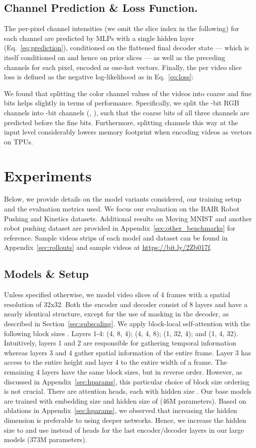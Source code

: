 \documentclass{article} \usepackage{iclr2020_conference,times}
\begin{document}
\subsection{Channel Prediction \& Loss Function.}

The per-pixel channel intensities  (we omit the slice index  in the following) for each channel  are predicted by MLPs with a single hidden layer (Eq.~\ref{eq:prediction}), conditioned on the flattened final decoder state  --- which is itself conditioned on  and hence on prior slices  --- as well as the preceding channels  for each pixel, encoded as one-hot vectors. Finally, the per video slice loss is defined as the negative log-likelihood as in Eq.~\ref{eq:loss}:


We found that splitting the color channel values of the videos into coarse and fine bits helps slightly in terms of performance. Specifically, we split the -bit RGB channels into -bit channels (,  ), such that the coarse bits of all three channels are predicted before the fine bits. Furthermore, splitting channels this way at the input level considerably lowers memory footprint when encoding videos as  vectors on TPUs.


\section{Experiments}
Below, we provide details on the model variants considered, our training setup and the evaluation metrics used. We focus our evaluation on the BAIR Robot Pushing and Kinetics datasets. Additional results on Moving MNIST and another robot pushing dataset are provided in Appendix~\ref{sec:other_benchmarks} for reference.
Sample videos strips of each model and dataset can be found in Appendix~\ref{sec:rollouts} and sample videos at \url{https://bit.ly/2Zb017f}.

\subsection{Models \& Setup}
Unless specified otherwise, we model video slices of 4 frames with a spatial resolution of 32x32.
Both the encoder and decoder consist of 8 layers and have a nearly identical structure, except for the use of masking in the decoder, as described in Section~\ref{sec:subscaling}. We apply block-local self-attention with the following block sizes . Layers 1-4: (4, 8, 4); (4, 4, 8); (1, 32, 4); and (1, 4, 32). Intuitively, layers 1 and 2 are responsible for gathering temporal information whereas layers 3 and 4 gather spatial information of the entire frame. Layer 3 has access to the entire height and layer 4 to the entire width of a frame. The remaining 4 layers have the same block sizes, but in reverse order. However, as discussed in Appendix~\ref{sec:hparams}, this particular choice of block size ordering is not crucial.
There are  attention heads, each with hidden size . Our base models are trained with embedding size  and hidden size of  (46M parameters). Based on ablations in Appendix~\ref{sec:hparams}, we observed that increasing the hidden dimension is preferable to using deeper networks. Hence, we increase the hidden size to  and use  instead of  heads for the last  encoder/decoder layers in our large models (373M parameters).
\end{document}
